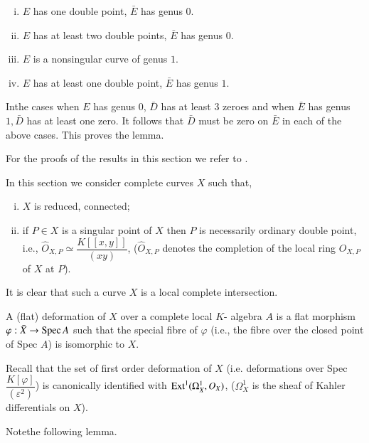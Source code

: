 {\begin{enumerate}[i)]
\item $E$  has one double point, $\bar{E}$ has genus $0$.

\item $E$  has at  least two double points, $\bar{E}$ has genus $0$.

\item $E$ is a nonsingular curve of genus $1$.

\item $E$  has at least one  double point, $\bar{E}$ has genus $1$.
\end{enumerate}

In\pageoriginale the cases when  $E$ has genus $0$, $\bar{D}$ has at
least 3 zeroes and when $\bar{E}$ has  genus $1, \bar{D} $ has at
least one zero. It follows that  $\bar{D}$ must be zero on $\bar{E}$
in each of the above cases. This proves the lemma.  

For the proofs of the  results in this section we refer to \cite{key1}.

\bigskip
{}%

 In this section we consider complete curves  $X$ such that,
\begin{enumerate}[i)]
\item  $X$ is reduced, connected;

\item if $ P\in X$ is a singular point of $X$ then $P$ is
  necessarily ordinary double point, i.e., $\hat{O}_{X,P} \simeq
  \dfrac{K[[x,y]]}{(xy)}$, ($\hat{O}_{X,P}$ denotes the completion of
  the local ring $O_{X,P} $ of $X$ at $P$). 
\end{enumerate}
It is clear that such a curve $X$ is a local complete  intersection. 

\setcounter{subdefin}{8}
\begin{subdefin}\label{chap0:subdef0.1.9} %
A (flat) deformation of $X$ over a complete local $K$-
  algebra $A$  is  a flat morphism  $\varphi : \bar{X} \rightarrow
\operatorname{Spec} A $ such that the  special fibre of $\varphi$ (i.e., the fibre
over the closed  point of Spec $A$)  is isomorphic to $X$. 
\end{subdefin}

Recall that the  set of first order deformation of $X$
(i.e. deformations over Spec $\dfrac{K [\varphi]}{(\varepsilon^2)}$)
is canonically identified with $\operatorname{Ext}^1 ( \Omega^1_X, O_X)$,
($\Omega^1_X$ is the sheaf  of Kahler differentials on $X$). 

Note\pageoriginale the following lemma. 

}
